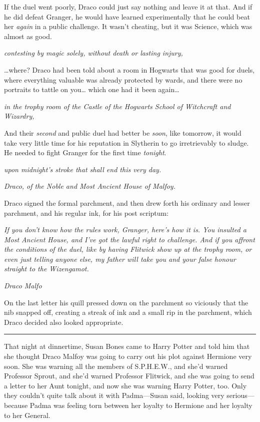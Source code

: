 If the duel went poorly, Draco could just say nothing and leave it at
that. And if he did defeat Granger, he would have learned experimentally
that he could beat her \emph{again} in a public challenge. It wasn't
cheating, but it was Science, which was almost as good.

\emph{contesting by magic solely, without death or lasting injury,}

\ldots{}where? Draco had been told about a room in Hogwarts that was
good for duels, where everything valuable was already protected by
wards, and there were no portraits to tattle on you\ldots{} which one
had it been again\ldots{}

\emph{in the trophy room of the Castle of the Hogwarts School of
Witchcraft and Wizardry,}

And their \emph{second} and public duel had better be \emph{soon}, like
tomorrow, it would take very little time for his reputation in Slytherin
to go irretrievably to sludge. He needed to fight Granger for the first
time \emph{tonight}.

\emph{upon midnight's stroke that shall end this very day.}

\emph{Draco, of the Noble and Most Ancient House of Malfoy.}

Draco signed the formal parchment, and then drew forth his ordinary and
lesser parchment, and his regular ink, for his post scriptum:

\emph{If you don't know how the rules work, Granger, here's how it is.
You insulted a Most Ancient House, and I've got the lawful right to
challenge. And if you affront the conditions of the duel, like by having
Flitwick show up at the trophy room, or even just telling anyone else,
my father will take you and your false honour straight to the
Wizengamot.}

\emph{Draco Malfo}

On the last letter his quill pressed down on the parchment so viciously
that the nib snapped off, creating a streak of ink and a small rip in
the parchment, which Draco decided also looked appropriate.

\begin{center}\rule{3in}{0.4pt}\end{center}

That night at dinnertime, Susan Bones came to Harry Potter and told him
that she thought Draco Malfoy was going to carry out his plot against
Hermione very soon. She was warning all the members of S.P.H.E.W., and
she'd warned Professor Sprout, and she'd warned Professor Flitwick, and
she was going to send a letter to her Aunt tonight, and now she was
warning Harry Potter, too. Only they couldn't quite talk about it with
Padma---Susan said, looking very serious---because Padma was feeling
torn between her loyalty to Hermione and her loyalty to her General.

